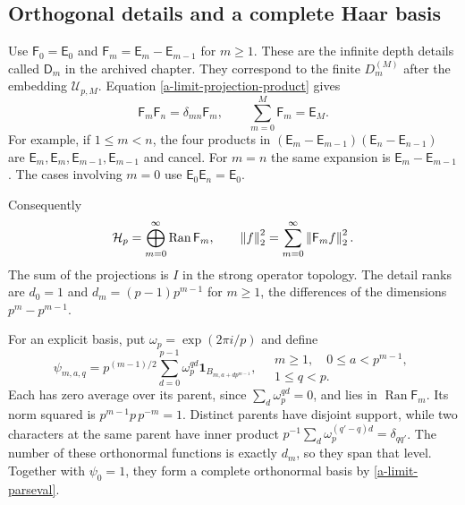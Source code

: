 \subsection{Orthogonal details and a complete Haar basis}

Use $\mathsf F_0=\mathsf E_0$ and
$\mathsf F_m=\mathsf E_m-\mathsf E_{m-1}$ for $m\geq1$. These are the
infinite depth details called $\mathsf D_m$ in the archived chapter.
They correspond to the finite $D_m^{(M)}$ after the embedding
$\mathcal U_{p,M}$. Equation \eqref{a-limit-projection-product} gives
\begin{equation}
 \mathsf F_m\mathsf F_n=\delta_{mn}\mathsf F_m,
 \qquad \sum_{m=0}^M\mathsf F_m=\mathsf E_M.
 \label{a-limit-detail-algebra}
\end{equation}
For example, if $1\leq m<n$, the four products in
$(\mathsf E_m-\mathsf E_{m-1})(\mathsf E_n-\mathsf E_{n-1})$
are $\mathsf E_m,\mathsf E_m,\mathsf E_{m-1},\mathsf E_{m-1}$ and cancel.
For $m=n$ the same expansion is
$\mathsf E_m-\mathsf E_{m-1}$. The cases involving $m=0$ use
$\mathsf E_0\mathsf E_n=\mathsf E_0$.

Consequently
\begin{equation}
 \mathcal H_p=\bigoplus_{m=0}^{\infty}\operatorname{Ran}\mathsf F_m,
 \qquad \left\lVert f\right\rVert_2^2=\sum_{m=0}^{\infty}\left\lVert\mathsf F_mf\right\rVert_2^2.
 \label{a-limit-parseval}
\end{equation}
The sum of the projections is $I$ in the strong operator topology.
The detail ranks are $d_0=1$ and $d_m=(p-1)p^{m-1}$ for $m\geq1$,
the differences of the dimensions $p^m-p^{m-1}$.

For an explicit basis, put $\omega_p=\exp(2\pi i/p)$ and define
\begin{equation}
 \psi_{m,a,q}=p^{(m-1)/2}\sum_{d=0}^{p-1}
 \omega_p^{qd}\mathbf1_{B_{m,a+d p^{m-1}}},
 \quad
 \begin{matrix}m\geq1,\quad 0\leq a<p^{m-1},\\1\leq q<p.\end{matrix}
 \label{a-limit-haar-wavelets}
\end{equation}
Each has zero average over its parent, since
$\sum_d\omega_p^{qd}=0$, and lies in $\operatorname{Ran}\mathsf F_m$.
Its norm squared is $p^{m-1}p\,p^{-m}=1$. Distinct parents have disjoint
support, while two characters at the same parent have inner product
$p^{-1}\sum_d\omega_p^{(q'-q)d}=\delta_{qq'}$. The number of these
orthonormal functions is exactly $d_m$, so they span that level.
Together with $\psi_0=1$, they form a complete orthonormal basis by
\eqref{a-limit-parseval}.

